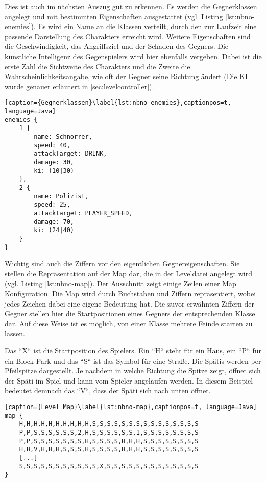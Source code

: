 Dies ist auch im nächsten Auszug gut zu erkennen. Es werden die Gegnerklassen angelegt und mit bestimmten Eigenschaften ausgestattet (vgl. Listing \ref{lst:nbno-enemies}). Es wird ein Name an die Klassen verteilt, durch den zur Laufzeit eine passende Darstellung des Charakters erreicht wird. Weitere Eigenschaften sind die Geschwindigkeit, das Angriffsziel und der Schaden des Gegners. Die künstliche Intelligenz des Gegenspielers wird hier ebenfalls vergeben. Dabei ist die erste Zahl die Sichtweite des Charakters und die Zweite die Wahrscheinlichkeitsangabe, wie oft der Gegner seine Richtung ändert (Die KI wurde genauer erläutert in \ref{sec:levelcontroller}).

\begin{lstlisting}[caption={Gegnerklassen}\label{lst:nbno-enemies},captionpos=t, language=Java]
enemies {
    1 {
        name: Schnorrer,
        speed: 40,
        attackTarget: DRINK,
        damage: 30,
        ki: (10|30)
    },
    2 {
        name: Polizist,
        speed: 25,
        attackTarget: PLAYER_SPEED,
        damage: 70,
        ki: (24|40)
    }
}
\end{lstlisting}

Wichtig sind auch die Ziffern vor den eigentlichen Gegnereigenschaften. Sie stellen die Repräsentation auf der Map dar, die in der Leveldatei angelegt wird (vgl. Listing \ref{lst:nbno-map}). Der Ausschnitt zeigt einige Zeilen einer Map Konfiguration. Die Map wird durch Buchstaben und Ziffern repräsentiert, wobei jedes Zeichen dabei eine eigene Bedeutung hat. Die zuvor erwähnten Ziffern der Gegner stellen hier die Startpositionen eines Gegners der entsprechenden Klasse dar. Auf diese Weise ist es möglich, von einer Klasse mehrere Feinde starten zu lassen.

Das ``X`` ist die Startposition des Spielers. Ein ``H`` steht für ein Haus, ein ``P`` für ein Block Park und das ``S`` ist das Symbol für eine Straße. Die Spätis werden per Pfeilspitze dargestellt. Je nachdem in welche Richtung die Spitze zeigt, öffnet sich der Späti im Spiel und kann vom Spieler angelaufen werden. In diesem Beispiel bedeutet demnach das ``V``, dass der Späti sich nach unten öffnet.

\begin{lstlisting}[caption={Level Map}\label{lst:nbno-map},captionpos=t, language=Java] 
map {
    H,H,H,H,H,H,H,H,H,H,S,S,S,S,S,S,S,S,S,S,S,S,S,S,S
    P,P,S,S,S,S,S,S,2,H,S,S,S,S,S,S,1,S,S,S,S,S,S,S,S
    P,P,S,S,S,S,S,S,S,H,S,S,S,S,H,H,H,S,S,S,S,S,S,S,S
    H,H,V,H,H,H,S,S,S,H,S,S,S,S,H,H,H,S,S,S,S,S,S,S,S
	[...]
    S,S,S,S,S,S,S,S,S,S,S,X,S,S,S,S,S,S,S,S,S,S,S,S,S
}
\end{lstlisting}

